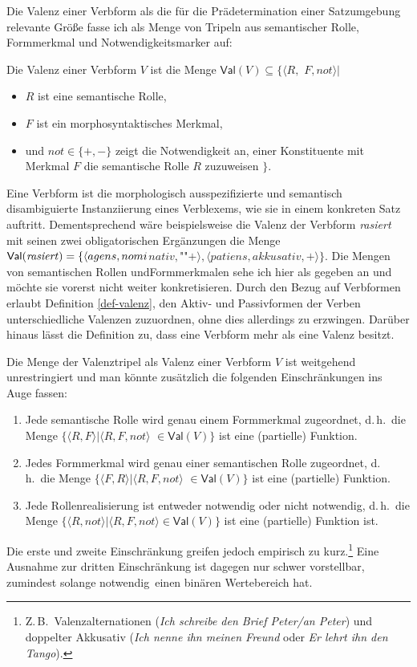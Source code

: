 Die Valenz einer Verbform als die für die Prädetermination einer Satzumgebung relevante Grö\ss e fasse ich als Menge von Tripeln aus semantischer Rolle, Formmerkmal und Notwendigkeitsmarker auf:
\begin{definition}[Valenz] \label{def-valenz}
Die Valenz einer Verbform $V$ ist die Menge $\mathsf{Val}(V) \subseteq \{ \langle R,$ $F, not \rangle |$ 
\begin{itemize}
	\item $R$ ist eine semantische Rolle, 
	\item $F$ ist ein morphosyntaktisches Merkmal,
	\item und $not \in \{+,-\}$ zeigt die Notwendigkeit an, einer Konstituente mit Merkmal $F$ die semantische Rolle $R$ zuzuwei\-sen $\}$.
\end{itemize} 
\end{definition}
Eine Verbform ist die morphologisch ausspezifizierte und semantisch disambiguierte Instanziierung eines Verblexems, wie sie in einem konkreten Satz auftritt. Dementsprechend wäre beispielsweise die Valenz der Verbform \textit{rasiert} mit seinen zwei obligatorischen Ergänzungen die Menge $\mathsf{Val}(\text{\textit{rasiert}}) = \{\langle agens, nomi$\-$nativ, $""$+\rangle, \langle patiens, akkusativ, +\rangle\}$. Die Mengen von semantischen Rollen und\linebreak Formmerkmalen sehe ich hier als gegeben an und möchte sie vorerst nicht weiter konkretisieren. Durch den Bezug auf Verbformen erlaubt Definition \ref{def-valenz}, den Aktiv- und Passivformen der Verben unterschiedliche Valenzen zuzuordnen, ohne dies allerdings zu erzwingen. Darüber hinaus lässt die Definition zu, dass eine Verbform mehr als eine Valenz besitzt. 

Die Menge der Valenztripel als Valenz einer Verbform $V$ ist weitgehend unrestringiert und man könnte zusätzlich die folgenden Einschränkungen ins Auge fassen: 
\begin{enumerate}\setlength{\itemsep}{-.5ex}
  \item Jede semantische Rolle wird genau einem Formmerkmal zugeordnet, d.\,h.\ die Menge $\{\langle R,F \rangle | \langle R,F,not \rangle$ $\in \mathsf{Val}(V) \}$ ist eine (partielle) Funktion.
  \item Jedes Formmerkmal wird genau einer semantischen Rolle zugeordnet, d.\,h.\ die Menge $\{\langle F,R \rangle | \langle R,F,not \rangle$ $\in \mathsf{Val}(V) \}$ ist eine (partielle) Funktion.
  \item Jede Rollenrealisierung ist entweder notwendig oder nicht notwendig, d.\,h.\ die Menge $\{\langle R, not \rangle | \langle R,F,not \rangle \in \mathsf{Val}(V) \}$ ist eine (partielle) Funktion ist.
\end{enumerate}
Die erste und zweite Einschränkung greifen jedoch empirisch zu kurz.\footnote{Z.\,B.\ Valenzalternationen (\textit{Ich schreibe den Brief Peter/an Peter}) und doppelter Akkusativ (\textit{Ich nenne ihn meinen Freund} oder \textit{Er lehrt ihn den Tango}).} Eine Ausnahme zur dritten Einschränkung ist dagegen nur schwer vorstellbar, zumindest solange \glq notwendig\grq\ einen binären Wertebereich hat. 

